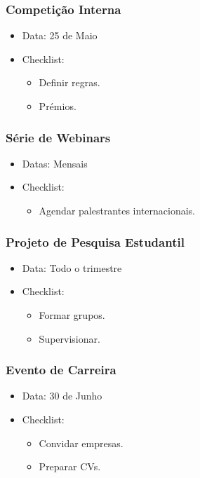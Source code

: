 \documentclass[12pt]{article}
\begin{document}
\subsubsection{Competição Interna}
\begin{itemize}
    \item Data: 25 de Maio
    \item Checklist:
      \begin{itemize}
        \item Definir regras.
        \item Prémios.
      \end{itemize}
\end{itemize}

\subsubsection{Série de Webinars}
\begin{itemize}
    \item Datas: Mensais
    \item Checklist:
      \begin{itemize}
        \item Agendar palestrantes internacionais.
      \end{itemize}
\end{itemize}

\subsubsection{Projeto de Pesquisa Estudantil}
\begin{itemize}
    \item Data: Todo o trimestre
    \item Checklist:
      \begin{itemize}
        \item Formar grupos.
        \item Supervisionar.
      \end{itemize}
\end{itemize}

\subsubsection{Evento de Carreira}
\begin{itemize}
    \item Data: 30 de Junho
    \item Checklist:
      \begin{itemize}
        \item Convidar empresas.
        \item Preparar CVs.
      \end{itemize}
\end{itemize}
\end{document}
